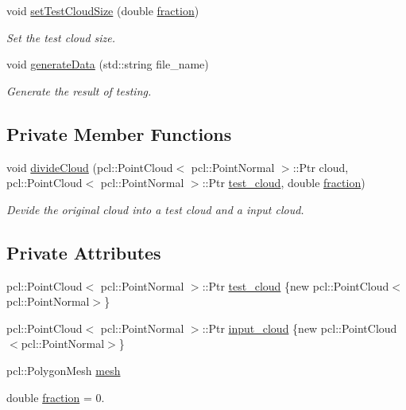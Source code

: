 \begin{DoxyCompactItemize}
void \hyperlink{classbenchmark_1_1_benchmark_a707e7974bcb0b5b2ee231e9e7cb142a8}{set\+Test\+Cloud\+Size} (double \hyperlink{classbenchmark_1_1_benchmark_ac05259c7c78e7f7fd12c8c573e96871e}{fraction})
\begin{DoxyCompactList}\small\item\em Set the test cloud size. \end{DoxyCompactList}\item 
void \hyperlink{classbenchmark_1_1_benchmark_a56970453ee4a690a35135ffc07dffb34}{generate\+Data} (std\+::string file\+\_\+name)
\begin{DoxyCompactList}\small\item\em Generate the result of testing. \end{DoxyCompactList}\end{DoxyCompactItemize}
\subsection*{Private Member Functions}
\begin{DoxyCompactItemize}
\item 
void \hyperlink{classbenchmark_1_1_benchmark_a9c9393327cf0af813804f8d46a2d1f5c}{divide\+Cloud} (pcl\+::\+Point\+Cloud$<$ pcl\+::\+Point\+Normal $>$\+::Ptr cloud, pcl\+::\+Point\+Cloud$<$ pcl\+::\+Point\+Normal $>$\+::Ptr \hyperlink{classbenchmark_1_1_benchmark_a9089b4dd75c60319db0450304c073828}{test\+\_\+cloud}, double \hyperlink{classbenchmark_1_1_benchmark_ac05259c7c78e7f7fd12c8c573e96871e}{fraction})
\begin{DoxyCompactList}\small\item\em Devide the original cloud into a test cloud and a input cloud. \end{DoxyCompactList}\end{DoxyCompactItemize}
\subsection*{Private Attributes}
\begin{DoxyCompactItemize}
\item 
pcl\+::\+Point\+Cloud$<$ pcl\+::\+Point\+Normal $>$\+::Ptr \hyperlink{classbenchmark_1_1_benchmark_a9089b4dd75c60319db0450304c073828}{test\+\_\+cloud} \{new pcl\+::\+Point\+Cloud$<$pcl\+::\+Point\+Normal$>$\}
\item 
pcl\+::\+Point\+Cloud$<$ pcl\+::\+Point\+Normal $>$\+::Ptr \hyperlink{classbenchmark_1_1_benchmark_a472d2ad851caafd323436e779ae68e56}{input\+\_\+cloud} \{new pcl\+::\+Point\+Cloud$<$pcl\+::\+Point\+Normal$>$\}
\item 
pcl\+::\+Polygon\+Mesh \hyperlink{classbenchmark_1_1_benchmark_ac909ac5421efc317d13cccbe8049879d}{mesh}
\item 
double \hyperlink{classbenchmark_1_1_benchmark_ac05259c7c78e7f7fd12c8c573e96871e}{fraction} = 0.
\end{DoxyCompactItemize}


